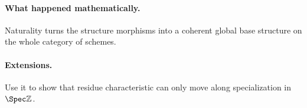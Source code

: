 \paragraph{What happened mathematically.}
Naturality turns the structure morphisms into a coherent global base structure on the whole category of schemes.

\paragraph{Extensions.}
Use it to show that residue characteristic can only move along specialization in $\Spec\mathbb Z$.
\fi
